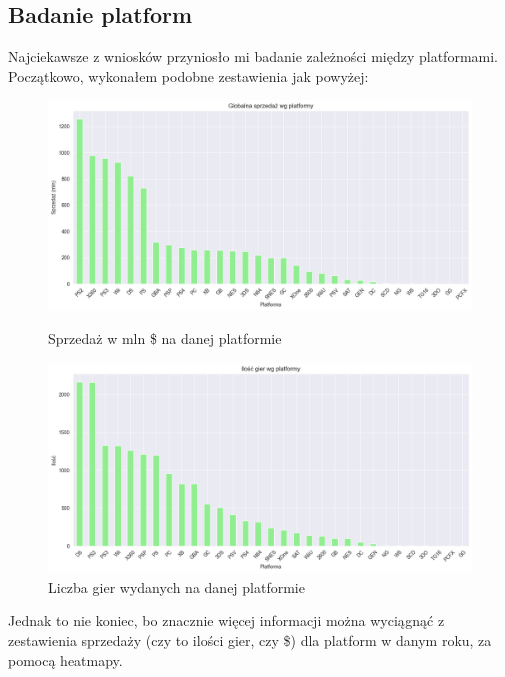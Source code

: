 \documentclass[11pt]{article}
\begin{document}
\subsection{Badanie platform}\label{subsec:badanie-platform}
Najciekawsze z wniosków przyniosło mi badanie zależności między platformami.
Początkowo, wykonałem podobne zestawienia jak powyżej:

\begin{figure}[H]
    \centering
    \begin{minipage}[t]{0.48\linewidth}
        \centering
        \includegraphics[width=\linewidth]{figures/platforma-sprzedaz}
        \caption{Sprzedaż w mln \$ na danej platformie}
        \label{fig:platform}
    \end{minipage}
    \hfill
    \begin{minipage}[t]{0.48\linewidth}
        \centering
        \includegraphics[width=\linewidth]{figures/platforma-ilosc}
        \caption{Liczba gier wydanych na danej platformie}
        \label{fig:platform2}
    \end{minipage}
\end{figure}

Jednak to nie koniec, bo znacznie więcej informacji można wyciągnąć z zestawienia sprzedaży (czy to ilości gier, czy \$) dla platform w danym roku, za pomocą heatmapy.
\end{document}
